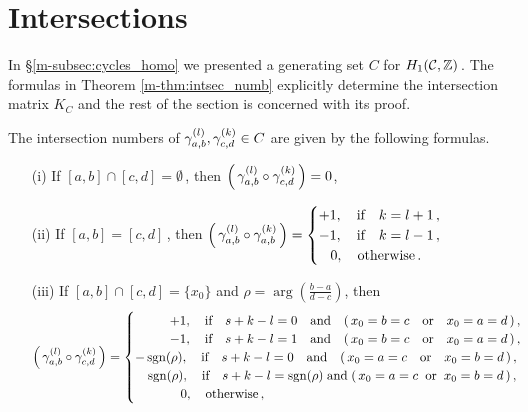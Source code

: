 \documentclass[main.tex]{subfiles}
\begin{document}
  \section{Intersections}\label{sec:intersections}

  In \S \ref{m-subsec:cycles_homo} we presented a generating set $C$ for $H_1(\mathcal{C},\mathbb{Z})$\,. The formulas in Theorem \ref{m-thm:intsec_numb} explicitly determine the intersection matrix $K_C$ and
  the rest of the section is concerned with its proof.
  
  \begin{thm}\label{thm:intsec_numb}
      The intersection numbers of $\gamma_{a,b}^{(l)}, \gamma_{c,d}^{(k)} \in C$ are given by the following formulas.
      \begin{itemize}
       \item[(i)] If $[a,b] \cap [c,d] = \emptyset$\,, then $\left(\,\gamma_{a,b}^{(l)} \circ \gamma_{c,d}^{(k)}\,\right) = 0$, 
       \item[(ii)] If $[a,b] = [c,d]$\,, then $\left(\,\gamma_{a,b}^{(l)} \circ \gamma_{a,b}^{(k)}\,\right) = \begin{cases}
	 +1, \quad \text{if} \quad k = l+1\,, \\
	 -1, \quad \text{if} \quad k = l-1\,, \\
	  \quad\! 0, \quad \text{otherwise}\,.
	\end{cases}$
      \item[(iii)] If $[a,b] \cap [c,d] = \{x_0\}$ and $\rho = \arg\left(\frac{b-a}{d-c}\right)$, then
      \begin{align*}
       \left(\,\cyabl \circ \cycdk\,\right) = \begin{cases}
            \hspace*{0.95cm} +1, \quad  \text{if} \quad s+k-l=0 \quad \text{and} \quad (\,x_0 = b = c \quad \text{or} \quad x_0 = a = d\,)\,,\\
	     \hspace*{0.95cm} -1, \quad \text{if} \quad s+k-l=1 \quad \text{and} \quad (\,x_0 = b = c \quad \text{or} \quad x_0 = a = d\,)\,,\\
           -\sgn(\rho), \quad  \text{if} \quad s+k-l=0 \quad \text{and} \quad (\,x_0 = a = c \quad \text{or} \quad x_0 = b = d\,)\,,\\
           \quad \sgn(\rho), \quad  \text{if} \quad s+k-l=\sgn(\rho) \; \text{and} \; (\,x_0 = a = c \;\; \text{or} \;\; x_0 = b = d\,)\,,\\
         \hspace*{0.95cm}  \quad\! 0, \quad \text{otherwise}\,,
        \end{cases}

\end{align*}
\end{itemize}
\end{thm}
\end{document}
